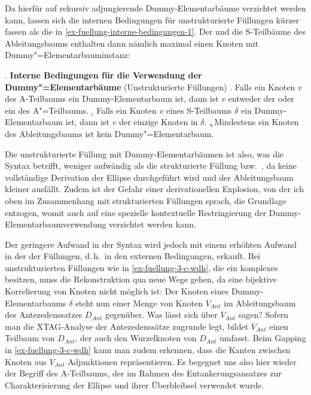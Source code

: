 Da hierfür auf rekursiv adjungierende Dummy-Elementarbäume verzichtet werden kann, lassen sich die internen Bedingungen für unstrukturierte Füllungen kürzer fassen als die in \ref{ex-fuellung-interne-bedingungen-1}. Der  und die S-Teilbäume des Ableitungsbaums enthalten dann nämlich maximal einen Knoten mit Dummy"=Elementarbauminstanz:

\ex. {\bf Interne Bedingungen für die Verwendung der Dummy"=Elementarbäume} (Unstrukturierte Füllungen) \label{ex-fuellung-interne-bedingungen-2}
\a. Falls ein Knoten $v$ des A-Teilbaums ein Dummy-Elementarbaum ist, dann ist $v$ entweder der  oder ein  des A"=Teilbaums.
\b. Falls ein Knoten $v$ eines S-Teilbaums $\delta$ ein Dummy-Elementarbaum ist, dann ist $v$ der einzige Knoten in $\delta$.
\c. Mindestens ein Knoten des Ableitungsbaums ist kein Dummy"=Elementarbaum.
 
Die unstrukturierte Füllung mit Dummy-Elementarbäumen ist also, was die Syntax betrifft, weniger aufwändig als die strukturierte Füllung bzw.\ , da keine vollständige Derivation der Ellipse durchgeführt wird und der Ableitungsbaum kleiner ausfällt. Zudem ist der Gefahr einer derivationellen Explosion, von der ich oben im Zusammenhang mit strukturierten Füllungen sprach, die Grundlage entzogen, womit auch auf eine spezielle kontextuelle Restringierung der Dummy-Elementarbaumverwendung verzichtet werden kann.

Der geringere Aufwand in der Syntax wird jedoch mit einem erhöhten Aufwand in der  der Füllungen, d.\,h.\ in den externen Bedingungen, erkauft. Bei unstrukturierten Füllungen wie in \ref{ex-fuellung-3-c-wdh}, die ein komplexes  besitzen, muss die Rekonstruktion qua  neue Wege gehen, da eine bijektive Korrelierung von Knoten nicht möglich ist: Der Knoten eines Dummy-Elementarbaums $\delta$ steht nun einer Menge von Knoten $V_{\mathit{Ant}}$ im Ableitungsbaum des Antezedenssatzes $D_{\mathit{Ant}}$ gegenüber. Was lässt sich über $V_{\mathit{Ant}}$ sagen? Sofern man die XTAG-Analyse der Antezedenssätze zugrunde legt, bildet $V_{\mathit{Ant}}$ einen Teilbaum von $D_{\mathit{Ant}}$, der auch den Wurzelknoten von $D_{\mathit{Ant}}$ umfasst. Beim Gapping in \ref{ex-fuellung-3-c-wdh} kann man zudem erkennen, dass die Kanten zwischen Knoten aus $V_{\mathit{Ant}}$ Adjunktionen repräsentieren. Es begegnet uns also hier wieder der Begriff des A-Teilbaums, der im Rahmen des Entankerungsansatzes zur Charakterisierung der Ellipse und ihrer Überbleibsel verwendet wurde. 

